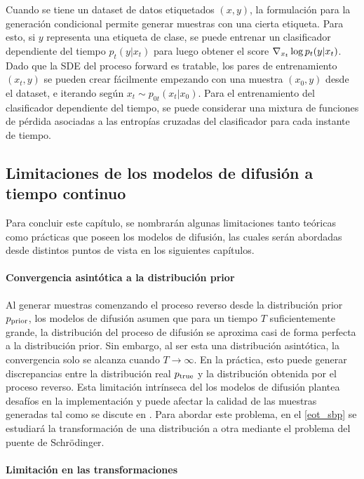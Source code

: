 Cuando se tiene un dataset de datos etiquetados $(x,y)$, la formulación para la generación condicional permite generar muestras con una cierta etiqueta. Para esto, si $y$ representa una etiqueta de clase, se puede entrenar un clasificador dependiente del tiempo $p_t(y|x_t)$ para luego obtener el score $\nabla_{x_t} \log p_t(y|x_t)$. Dado que la SDE del proceso forward es tratable, los pares de entrenamiento $(x_t,y)$ se pueden crear fácilmente empezando con una muestra $(x_0,y)$ desde el dataset, e iterando según $x_t\sim p_{0t}(x_t|x_0)$. Para el entrenamiento del clasificador dependiente del tiempo, se puede considerar una mixtura de funciones de pérdida asociadas a las entropías cruzadas del clasificador para cada instante de tiempo.

\subsection{Limitaciones de los modelos de difusión a tiempo continuo}
\label{dm/continuous_dm/limitations}

Para concluir este capítulo, se nombrarán algunas limitaciones tanto teóricas como prácticas que poseen los modelos de difusión, las cuales serán abordadas desde distintos puntos de vista en los siguientes capítulos.

\paragraph{Convergencia asintótica a la distribución prior}

Al generar muestras comenzando el proceso reverso desde la distribución prior $p_{\operatorname{prior}}$, los modelos de difusión asumen que para un tiempo $T$ suficientemente grande, la distribución del proceso de difusión se aproxima casi de forma perfecta a la distribución prior. Sin embargo, al ser esta una distribución asintótica, la convergencia solo se alcanza cuando $T \to \infty$. En la práctica, esto puede generar discrepancias entre la distribución real $p_{\operatorname{true}}$ y la distribución obtenida por el proceso reverso. Esta limitación intrínseca del los modelos de difusión plantea desafíos en la implementación y puede afectar la calidad de las muestras generadas tal como se discute en \cite{debortoli2023diffusion}. Para abordar este problema, en el \autoref{eot_sbp} se estudiará la transformación de una distribución a otra mediante el problema del puente de Schrödinger.

\paragraph{Limitación en las transformaciones}


